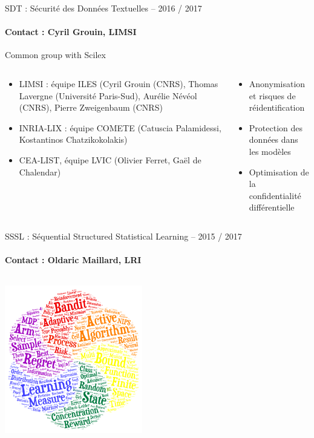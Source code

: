 \vspace{-1cm}
\begin{frame}{SDT : Sécurité des Données Textuelles – 2016 / 2017}
\framesubtitle{Contact : Cyril Grouin, LIMSI}
{\color{blue} }

Common group with Scilex
\begin{columns}
\begin{column}{8cm}
\begin{itemize}
\item LIMSI : équipe ILES (Cyril Grouin (CNRS), Thomas Lavergne (Université Paris-Sud), Aurélie Névéol (CNRS), Pierre Zweigenbaum (CNRS)
\item INRIA-LIX : équipe COMETE (Catuscia Palamidessi, Kostantinos Chatzikokolakis)
\item CEA-LIST, équipe LVIC (Olivier Ferret, Gaël de Chalendar)
\end{itemize}
\end{column}
\begin{column}{5cm}
\begin{itemize}
\item
Anonymisation et risques de réidentification
\item
Protection des données dans les modèles
\item
Optimisation de la confidentialité différentielle
\end{itemize}
\end{column}
\end{columns}
\end{frame}

\begin{frame}{SSSL : Séquential Structured Statistical Learning – 2015 / 2017}
\framesubtitle{Contact : Oldaric Maillard, LRI}
{\color{blue} }
\begin{columns}
\begin{column}{10cm}
\includegraphics[width=6cm]{Images/Cloud-13.png}
\end{column}
\end{columns}
\end{frame}
